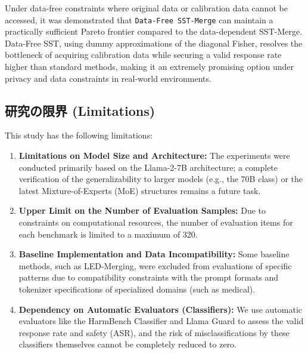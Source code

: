 \documentclass{article}
\begin{document}
Under data-free constraints where original data or calibration data cannot be accessed, it was demonstrated that \texttt{Data-Free SST-Merge} can maintain a practically sufficient Pareto frontier compared to the data-dependent SST-Merge. Data-Free SST, using dummy approximations of the diagonal Fisher, resolves the bottleneck of acquiring calibration data while securing a valid response rate higher than standard methods, making it an extremely promising option under privacy and data constraints in real-world environments.

\subsection{研究の限界 (Limitations)}

This study has the following limitations:
\begin{enumerate}
    \item \textbf{Limitations on Model Size and Architecture:} The experiments were conducted primarily based on the Llama-2-7B architecture; a complete verification of the generalizability to larger models (e.g., the 70B class) or the latest Mixture-of-Experts (MoE) structures remains a future task.
    \item \textbf{Upper Limit on the Number of Evaluation Samples:} Due to constraints on computational resources, the number of evaluation items for each benchmark is limited to a maximum of 320.
    \item \textbf{Baseline Implementation and Data Incompatibility:} Some baseline methods, such as LED-Merging, were excluded from evaluations of specific patterns due to compatibility constraints with the prompt formats and tokenizer specifications of specialized domains (such as medical).
    \item \textbf{Dependency on Automatic Evaluators (Classifiers):} We use automatic evaluators like the HarmBench Classifier and Llama Guard to assess the valid response rate and safety (ASR), and the risk of misclassifications by these classifiers themselves cannot be completely reduced to zero.
\end{enumerate}
\end{document}
